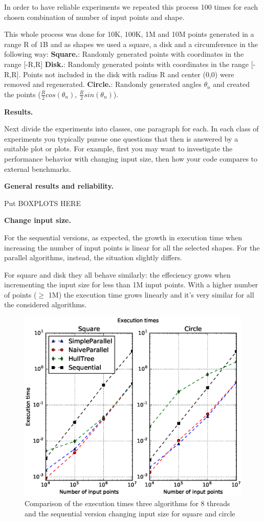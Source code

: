 \documentclass[letterpaper]{article}
\newcommand{\mypar}[1]{{\bf #1.}}
\begin{document}
In order to have reliable experiments we repeated this process 100 times for each chosen combination of number of input points and shape.

This whole process was done for 10K, 100K, 1M and 10M points generated in a range R of 1B and as shapes we used a square, a disk and a circumference in the following way:
\mypar{Square}: Randomly generated points with coordinates in the range [-R,R]
\mypar{Disk}: Randomly generated points with coordinates in the range [-R,R]. Points not included in the disk with radius R and center (0,0) were removed and regenerated.
\mypar{Circle}: Randomly generated angles $\theta_n$ and created the points ($\frac{R}{2}cos(\theta_n)$, $\frac{R}{2}sin(\theta_n)$).

\mypar{Results}

Next divide the experiments into classes, one paragraph for each. In each class of experiments you typically pursue one questions that then is answered by a suitable plot or plots. For example, first you may want to investigate the performance behavior with changing input size, then how your code compares to external benchmarks.

\mypar{General results and reliability}

Put BOXPLOTS HERE

\mypar{Change input size}

For the sequential versions, as expected, the growth in execution time when increasing the number of input points is linear for all the selected shapes.
For the parallel algorithms, instead, the situation slightly differs.

For square and disk they all behave similarly: the effeciency grows when incrementing the input size for less than 1M input points. With a higher number of points ($\geq$ 1M) the execution time grows linearly and it's very similar for all the considered algorithms.

\begin{figure}[!ht]\centering
  \includegraphics[scale=0.33]{./plots/time_points.eps}
  \caption{Comparison of the execution times three algorithms for 8 threads and the sequential version changing input size for square and circle\label{Input size time}}
\end{figure}
\end{document}
